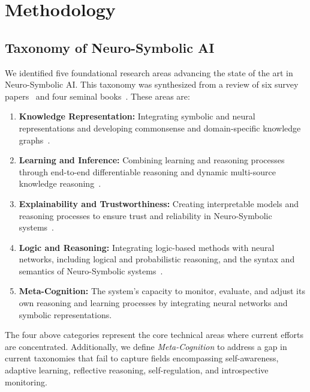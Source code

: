 \documentclass[hf]{ceurart}
\begin{document}
\section{Methodology}\label{sec:methodology}

\subsection{Taxonomy of Neuro-Symbolic AI}

We identified five foundational research areas advancing the state of the art in Neuro-Symbolic AI. This taxonomy was synthesized from a review of six survey papers~\cite{Gibaut2023, Yu2021, Wan2024, Marra2024, MichelDeletie2024, Bouneffouf2022} and four seminal books~\cite{Dingli2023, Hitzler2023, Hitzler2021, Shakarian2023}. These areas are:

\begin{enumerate}
    \item \textbf{Knowledge Representation:} Integrating symbolic and neural representations and developing commonsense and domain-specific knowledge graphs~\cite{Gibaut2023, Hitzler2023, Shakarian2023}.
    \item \textbf{Learning and Inference:} Combining learning and reasoning processes through end-to-end differentiable reasoning and dynamic multi-source knowledge reasoning~\cite{Yu2021, Wan2024, Dingli2023}.
    \item \textbf{Explainability and Trustworthiness:} Creating interpretable models and reasoning processes to ensure trust and reliability in Neuro-Symbolic systems~\cite{Marra2024, MichelDeletie2024}.
    \item \textbf{Logic and Reasoning:} Integrating logic-based methods with neural networks, including logical and probabilistic reasoning, and the syntax and semantics of Neuro-Symbolic systems~\cite{Marra2024, Shakarian2023}.
    \item \textbf{Meta-Cognition:} The system's capacity to monitor, evaluate, and adjust its own reasoning and learning processes by integrating neural networks and symbolic representations.
\end{enumerate}

The four above categories represent the core technical areas where current efforts are concentrated. Additionally, we define \textit{Meta-Cognition} to address a gap in current taxonomies that fail to capture fields encompassing self-awareness, adaptive learning, reflective reasoning, self-regulation, and introspective monitoring. 
\end{document}
